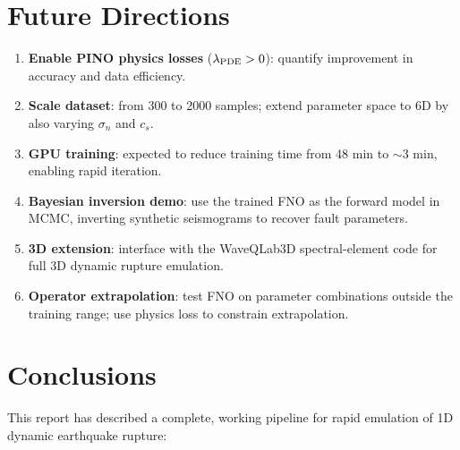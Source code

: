 \documentclass[12pt, a4paper]{article}
\theoremstyle{definition}
\begin{document}
\section{Future Directions}
\label{sec:future}

\begin{enumerate}[leftmargin=1.5cm]
  \item \textbf{Enable PINO physics losses} ($\lambda_{\rm PDE} > 0$):
    quantify improvement in accuracy and data efficiency.
  \item \textbf{Scale dataset}: from 300 to 2000 samples; extend parameter space
    to 6D by also varying $\sigma_n$ and $c_s$.
  \item \textbf{GPU training}: expected to reduce training time from 48 min to
    $\sim$3 min, enabling rapid iteration.
  \item \textbf{Bayesian inversion demo}: use the trained FNO as the forward
    model in MCMC, inverting synthetic seismograms to recover fault parameters.
  \item \textbf{3D extension}: interface with the WaveQLab3D spectral-element
    code for full 3D dynamic rupture emulation.
  \item \textbf{Operator extrapolation}: test FNO on parameter combinations
    outside the training range; use physics loss to constrain extrapolation.
\end{enumerate}

\section{Conclusions}
\label{sec:conclusions}

This report has described a complete, working pipeline for rapid emulation of
1D dynamic earthquake rupture:
\end{document}
